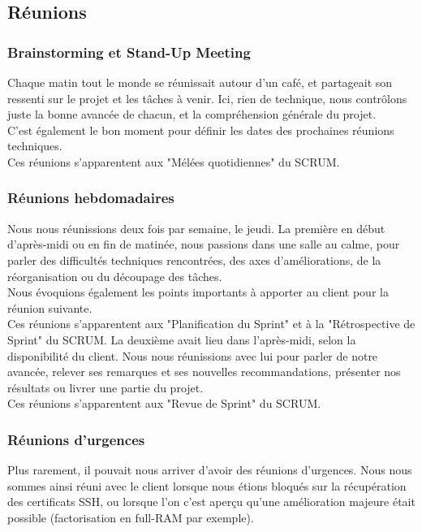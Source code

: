 \subsection{Réunions}

\subsubsection{Brainstorming et Stand-Up Meeting}

Chaque matin tout le monde se réunissait autour d'un café, et partageait son ressenti sur le projet et les tâches à venir. Ici, rien de technique, nous contrôlons juste la bonne avancée de chacun, et la compréhension générale du projet. \\
C'est également le bon moment pour définir les dates des prochaines réunions techniques.\\
Ces réunions s'apparentent aux "Mélées quotidiennes" du SCRUM.

\subsubsection{Réunions hebdomadaires}

Nous nous réunissions deux fois par semaine, le jeudi.
La première en début d'après-midi ou en fin de matinée, nous passions dans une salle au calme, pour parler des difficultés techniques rencontrées, des axes d'améliorations, de la réorganisation ou du découpage des tâches.\\
Nous évoquions également les points importants à apporter au client pour la réunion suivante.\\
Ces réunions s'apparentent aux "Planification du Sprint" et à la "Rétrospective de Sprint" du SCRUM.
La deuxième avait lieu dans l'après-midi, selon la disponibilité du client. Nous nous réunissions avec lui pour parler de notre avancée, relever ses remarques et ses nouvelles recommandations, présenter nos résultats ou livrer une partie du projet.\\
Ces réunions s'apparentent aux "Revue de Sprint" du SCRUM.

\subsubsection{Réunions d'urgences}

Plus rarement, il pouvait nous arriver d'avoir des réunions d'urgences. Nous nous sommes ainsi réuni avec le client lorsque nous étions bloqués sur la récupération des certificats SSH, ou lorsque l'on c'est aperçu qu'une amélioration majeure était possible (factorisation en full-RAM par exemple).

